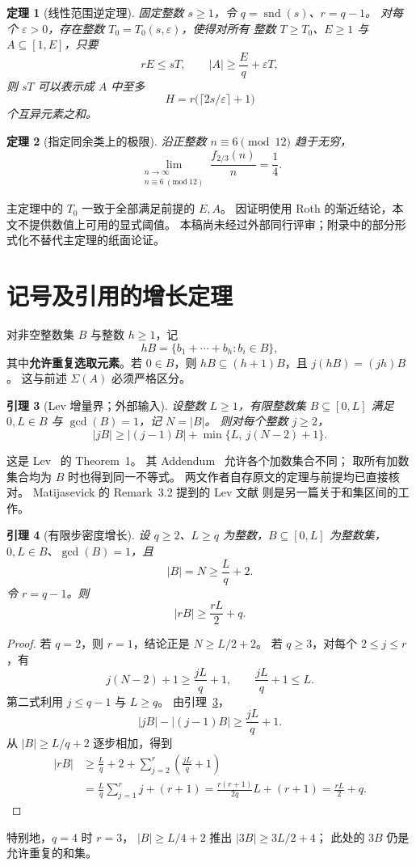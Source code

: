 \documentclass[UTF8,a4paper,11pt,fontset=none]{ctexart}
\newtheorem{theorem}{定理}[section]
\newtheorem{lemma}[theorem]{引理}
\theoremstyle{remark}
\newcommand{\sig}{\Sigma}
\newcommand{\snd}{\operatorname{snd}}
\newcommand{\gcdop}{\operatorname{gcd}}
\newcommand{\eps}{\varepsilon}
\begin{document}
\begin{theorem}[线性范围逆定理]\label{thm:main}
固定整数 $s\ge1$，令 $q=\snd(s)$、$r=q-1$。
对每个 $\eps>0$，存在整数 $T_0=T_0(s,\eps)$，使得对所有
整数 $T\ge T_0$、$E\ge1$ 与 $A\subseteq[1,E]$，只要
\[
  rE\le sT,\qquad |A|\ge\frac Eq+\eps T,
\]
则 $sT$ 可以表示成 $A$ 中至多
\[
  H=r\bigl(\lceil2s/\eps\rceil+1\bigr)
\]
个互异元素之和。
\end{theorem}

\begin{theorem}[指定同余类上的极限]\label{thm:limit}
沿正整数 $n\equiv6\pmod{12}$ 趋于无穷，
\[
  \lim_{\substack{n\to\infty\\n\equiv6\ (\mathrm{mod}\ 12)}}
      \frac{f_{2/3}(n)}n=\frac14 .
\]
\end{theorem}
主定理中的 $T_0$ 一致于全部满足前提的 $E,A$。
因证明使用 Roth 的渐近结论，本文不提供数值上可用的显式阈值。
本稿尚未经过外部同行评审；附录中的部分形式化不替代主定理的纸面论证。

\section{记号及引用的增长定理}
对非空整数集 $B$ 与整数 $h\ge1$，记
\[
 hB=\{b_1+\cdots+b_h:b_i\in B\},
\]
其中\textbf{允许重复选取元素}。若 $0\in B$，则
$hB\subseteq(h+1)B$，且 $j(hB)=(jh)B$。
这与前述 $\sig(A)$ 必须严格区分。

\begin{lemma}[Lev 增量界；外部输入]\label{lem:lev}
设整数 $L\ge1$，有限整数集 $B\subseteq[0,L]$ 满足
$0,L\in B$ 与 $\gcdop(B)=1$，记 $N=|B|$。
则对每个整数 $j\ge2$，
\[
 |jB|\ge|(j-1)B|+\min\{L,\ j(N-2)+1\}.
 \tag{2.1}\label{eq:lev}
\]
\end{lemma}
这是 Lev~\cite{Lev1996} 的 Theorem~1。
其 Addendum~\cite{LevAddendum1997} 允许各个加数集合不同；
取所有加数集合均为 $B$ 时也得到同一不等式。
两文作者自存原文的定理与前提均已直接核对。
Matijasevick 的 Remark~3.2 提到的 Lev 文献
\cite{Lev1997} 则是另一篇关于和集区间的工作。

\begin{lemma}[有限步密度增长]\label{lem:growth}
设 $q\ge2$、$L\ge q$ 为整数，$B\subseteq[0,L]$ 为整数集，
$0,L\in B$、$\gcdop(B)=1$，且
\[
 |B|=N\ge \frac Lq+2.
\]
令 $r=q-1$。则
\[
 \boxed{|rB|\ge\frac{rL}{2}+q.}\tag{2.2}\label{eq:growth}
\]
\end{lemma}
\begin{proof}
若 $q=2$，则 $r=1$，结论正是 $N\ge L/2+2$。
若 $q\ge3$，对每个 $2\le j\le r$，有
\[
 j(N-2)+1\ge\frac{jL}{q}+1,
 \qquad
 \frac{jL}{q}+1\le L.
\]
第二式利用 $j\le q-1$ 与 $L\ge q$。
由引理~\ref{lem:lev}，
\[
 |jB|-|(j-1)B|\ge\frac{jL}{q}+1.
\]
从 $|B|\ge L/q+2$ 逐步相加，得到
\begin{align*}
 |rB|
 &\ge\frac Lq+2+\sum_{j=2}^{r}
                       \left(\frac{jL}{q}+1\right)\\
 &=\frac Lq\sum_{j=1}^{r}j+(r+1)
 =\frac{r(r+1)}{2q}L+(r+1)
 =\frac{rL}{2}+q .
\end{align*}
\end{proof}
特别地，$q=4$ 时 $r=3$，
$|B|\ge L/4+2$ 推出 $|3B|\ge3L/2+4$；
此处的 $3B$ 仍是允许重复的和集。
\end{document}
